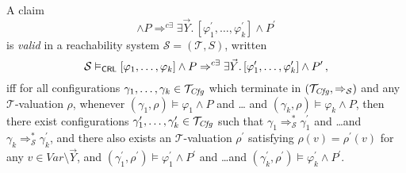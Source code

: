 \begin{definition}\label{def:opCRLsemantics}
    A claim
    \begin{equation*}
     [\varphi_1,\ldots,\varphi_k] \land P
     \Rightarrow^{c\exists} \exists \vec{Y}.\, [\varphi^\prime_1,\ldots,\varphi^\prime_k] \land P^\prime
    \end{equation*}
    is \emph{valid} in a reachability system $\mathcal{S} = (\mathcal{T}, S)$,
    written
    \begin{equation*}
        \mathcal{S} \vDash_{\mathsf{CRL}} [\varphi_1,\ldots,\varphi_k] \land P
     \Rightarrow^{c\exists} \exists \vec{Y}.\, [\varphi^\prime_1,\ldots,\varphi^\prime_k] \land P^\prime \, ,
    \end{equation*}
    iff for all configurations $\gamma_1,\ldots,\gamma_k \in \mathcal{T}_{\mathit{Cfg}}$
    which terminate in $(\mathcal{T}_{\mathit{Cfg}}, \Rightarrow_{\mathcal{S}})$
    and any $\mathcal{T}$-valuation $\rho$,
    whenever $(\gamma_1,\rho) \vDash \varphi_1 \land P$ and \ldots
    and $(\gamma_k,\rho) \vDash \varphi_k \land P$,
    then there exist configurations $\gamma_1^\prime,\ldots,\gamma_k^\prime \in \mathcal{T}_{\mathit{Cfg}}$
    such that $\gamma_1 \Rightarrow^{*}_{\mathcal{S}} \gamma_1^\prime$
    and \ldots and $\gamma_k \Rightarrow^{*}_{\mathcal{S}} \gamma_k^\prime$,
    and there also exists an $\mathcal{T}$-valuation $\rho^\prime$
    satisfying $\rho(v) = \rho^\prime(v)$ for any $v \in \mathit{Var} \setminus \vec{Y}$,
    and
    $(\gamma_1^\prime,\rho^\prime) \vDash \varphi^\prime_1 \land P^\prime$ and \ldots and $(\gamma_k^\prime, \rho^\prime) \vDash \varphi^\prime_k \land P^\prime$.
\end{definition}

